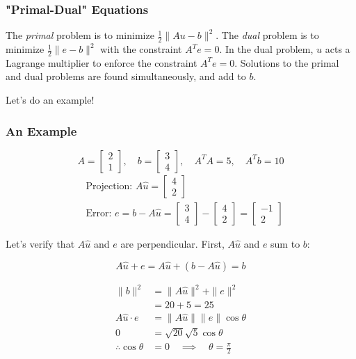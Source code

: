 \documentclass[]{article}
\begin{document}
\subsubsection{"Primal-Dual" Equations}
The \textit{primal} problem is to minimize $\frac{1}{2} \parallel Au - b \parallel^2$. The \textit{dual} problem is to minimize $\frac{1}{2} \parallel e - b \parallel^2$ with the constraint $A^T e = 0$. In the dual problem, $u$ acts a Lagrange multiplier to enforce the constraint $A^T e = 0$. Solutions to the primal and dual problems are found simultaneously, and add to $b$. 

Let's do an example!

\subsubsection{An Example}
\begin{equation}
A = \begin{bmatrix}2 \\ 1 \end{bmatrix}, \quad b = \begin{bmatrix}3 \\ 4\end{bmatrix}, \quad A^T A = 5, \quad A^T b = 10 
\end{equation}
\begin{align}
	&\textrm{Projection: } A\hat{u} = \begin{bmatrix}4 \\ 2\end{bmatrix} \\ 
	&\textrm{Error: } e = b - A\hat{u} = \begin{bmatrix}3 \\ 4 \end{bmatrix} - \begin{bmatrix}4 \\ 2\end{bmatrix} = \begin{bmatrix}-1 \\ 2\end{bmatrix} 
\end{align}

Let's verify that $A\hat{u}$ and $e$ are perpendicular. First, $A\hat{u}$ and $e$ sum to $b$:

\begin{equation}
A\hat{u} + e = A\hat{u} + (b - A\hat{u}) = b
\end{equation}

\begin{align}
\parallel b \parallel^2 &= \parallel A\hat{u} \parallel^2 + \parallel e \parallel^2 \\
&= 20 + 5 = 25 \\
A \hat{u} \cdot e &= \parallel A \hat{u} \parallel \parallel e \parallel \cos \theta \\
0 &= \sqrt{20} \sqrt{5} \cos \theta \\
\therefore \cos \theta &= 0 \quad \implies \quad \theta = \frac{\pi}{2} 
\end{align}
\end{document}
